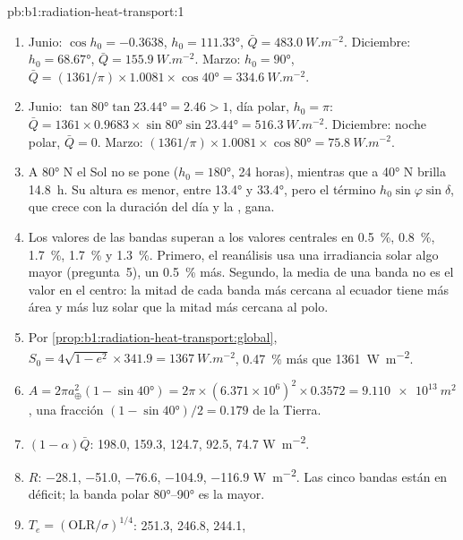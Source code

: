 \begin{solution}{pb:b1:radiation-heat-transport:1}
\begin{enumerate}
  \item Junio: $\cos h_0 = -0.3638$, $h_0 = \ang{111.33}$, $\bar Q =
        \qty{483.0}{W.m^{-2}}$. Diciembre: $h_0 = \ang{68.67}$, $\bar Q =
        \qty{155.9}{W.m^{-2}}$. Marzo: $h_0 = \ang{90}$, $\bar Q = (1361/\pi)
        \times 1.0081 \times \cos\ang{40} = \qty{334.6}{W.m^{-2}}$.
  \item Junio: $\tan\ang{80}\tan\ang{23.44} = 2.46 > 1$, día polar, $h_0 = \pi$:
        $\bar Q = 1361 \times 0.9683 \times \sin\ang{80}\sin\ang{23.44} =
        \qty{516.3}{W.m^{-2}}$. Diciembre: noche polar, $\bar Q = 0$. Marzo:
        $(1361/\pi) \times 1.0081 \times \cos\ang{80} = \qty{75.8}{W.m^{-2}}$.
  \item A \ang{80} N el Sol no se pone ($h_0 = \ang{180}$, 24 horas), mientras que a
        \ang{40} N brilla \qty{14.8}{h}. Su altura es menor, entre \ang{13.4} y \ang{33.4}, pero el término $h_0\sin\varphi\sin\delta$, que crece con la duración del día y la , gana.
  \item Los valores de las bandas superan a los valores centrales en \qty{0.5}{\percent},
        \qty{0.8}{\percent}, \qty{1.7}{\percent}, \qty{1.7}{\percent} y
        \qty{1.3}{\percent}. Primero, el reanálisis usa una irradiancia solar algo mayor (pregunta~5), un \qty{0.5}{\percent} más. Segundo, la media de una banda no es el valor en el centro: la mitad de cada banda más cercana al ecuador tiene más área y más luz solar que la mitad más cercana al polo.
  \item Por \cref{prop:b1:radiation-heat-transport:global}, $S_0 = 4\sqrt{1-e^2}
        \times 341.9 = \qty{1367}{W.m^{-2}}$, \qty{0.47}{\percent} más que \qty{1361}{W.m^{-2}}.
  \item $A = 2\pi a_\oplus^2(1 - \sin\ang{40}) = 2\pi \times (6.371\times10^6)^2
        \times 0.3572 = \qty{9.110e13}{m^2}$, una fracción $(1 - \sin\ang{40})/2 =
        0.179$ de la Tierra.
  \item $(1 - \alpha)\bar Q$: \num{198.0}, \num{159.3}, \num{124.7}, \num{92.5},
        \num{74.7} \unit{W.m^{-2}}.
  \item $R$: \num{-28.1}, \num{-51.0}, \num{-76.6}, \num{-104.9}, \num{-116.9}
        \unit{W.m^{-2}}. Las cinco bandas están en déficit; la banda polar
        \ang{80}--\ang{90} es la mayor.
  \item $T_e = (\text{OLR}/\sigma)^{1/4}$: \num{251.3}, \num{246.8}, \num{244.1},

\end{enumerate}
\end{solution}
